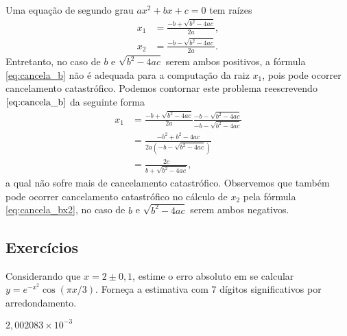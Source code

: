\begin{ex}\label{ex:solpq}
  Uma equação de segundo grau $ax^2 + bx + c = 0$ tem raízes
  \begin{align}
    x_1 &= \frac{-b + \sqrt{b^2 - 4ac}}{2a},\label{eq:cancela_b}\\
    x_2 &= \frac{-b - \sqrt{b^2 - 4ac}}{2a}.\label{eq:cancela_bx2}
  \end{align}
Entretanto, no caso de $b$ e $\sqrt{b^2 - 4ac}$ serem ambos positivos, a fórmula \eqref{eq:cancela_b} não é adequada para a computação da raiz $x_1$, pois pode ocorrer cancelamento catastrófico. Podemos contornar este problema reescrevendo $\eqref{eq:cancela_b}$ da seguinte forma
\begin{align}
  x_1 &= \frac{-b + \sqrt{b^2 - 4ac}}{2a}\frac{-b - \sqrt{b^2 - 4ac}}{-b - \sqrt{b^2 - 4ac}}\\
  &= \frac{-b^2 + b^2 - 4ac}{2a(-b-\sqrt{b^2-4ac})}\\
  &= \frac{2c}{b+\sqrt{b^2-4ac}},
\end{align}
a qual não sofre mais de cancelamento catastrófico. Observemos que também pode ocorrer cancelamento catastrófico no cálculo de $x_2$ pela fórmula \eqref{eq:cancela_bx2}, no caso de $b$ e $\sqrt{b^2 - 4ac}$ serem ambos negativos.

% 
\end{ex}

\subsection*{Exercícios}

\begin{exer}\label{exer:properro_abs1}
  Considerando que $x=2\pm 0,1$, estime o erro absoluto em se calcular $y = e^{-x^2}\cos(\pi x/3)$. Forneça a estimativa com $7$ dígitos significativos por arredondamento.
\end{exer}
\begin{resp}
  $2,002083\times 10^{-3}$
\end{resp}

